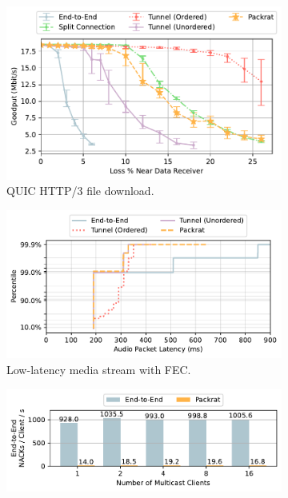 \begin{figure}[t]
    \centering
    \begin{subfigure}[b]{0.54\linewidth}
        \includegraphics[width=\linewidth]{packrat/figures/http_benchmark.pdf}
        \caption{QUIC HTTP/3 file download.}
        \label{fig:packrat:perf:http}
    \end{subfigure}
    \begin{subfigure}[b]{0.6\linewidth}
        \includegraphics[width=\linewidth]{packrat/figures/media_benchmark.pdf}
        \caption{Low-latency media stream with FEC.}
        \label{fig:packrat:perf:media}
    \end{subfigure}
    \begin{subfigure}[b]{0.6\linewidth}
        \includegraphics[width=\linewidth]{packrat/figures/multicast_benchmark.pdf}

\end{subfigure}
\end{figure}
